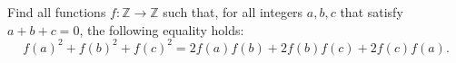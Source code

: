 Find all functions $f:\mathbb Z\rightarrow \mathbb Z$ such that, for all integers $a,b,c$ that satisfy $a+b+c=0$,  the following equality holds:\[f(a)^2+f(b)^2+f(c)^2=2f(a)f(b)+2f(b)f(c)+2f(c)f(a).\]
